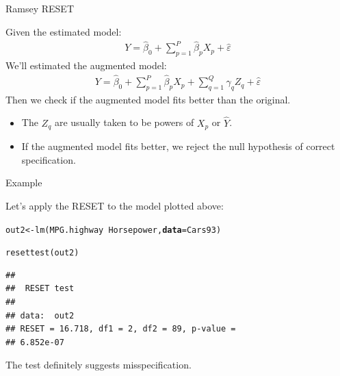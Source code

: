\documentclass{beamer}\usepackage[]{graphicx}\usepackage[]{color}
\makeatletter
\newcommand{\hlopt}[1]{\textcolor[rgb]{0,0,0}{#1}}%
\newcommand{\hlstd}[1]{\textcolor[rgb]{0,0,0}{#1}}%
\newcommand{\hlkwb}[1]{\textcolor[rgb]{0,0.341,0.682}{#1}}%
\newcommand{\hlkwc}[1]{\textcolor[rgb]{0,0,0}{\textbf{#1}}}%
\newcommand{\hlkwd}[1]{\textcolor[rgb]{0.004,0.004,0.506}{#1}}%
\newenvironment{kframe}{%
 \def\at@end@of@kframe{}%
 \ifinner\ifhmode%
  \def\at@end@of@kframe{\end{minipage}}%
  \begin{minipage}{\columnwidth}%
 \fi\fi%
 \def\FrameCommand##1{\hskip\@totalleftmargin \hskip-\fboxsep
 \colorbox{shadecolor}{##1}\hskip-\fboxsep
     \hskip-\linewidth \hskip-\@totalleftmargin \hskip\columnwidth}%
 \MakeFramed {\advance\hsize-\width
   \@totalleftmargin\z@ \linewidth\hsize
   \@setminipage}}%
 {\par\unskip\endMakeFramed%
 \at@end@of@kframe}
\newenvironment{knitrout}{}{} %
\makeatother
\begin{document}

\begin{frame}{Ramsey RESET}
  
  Given the estimated model:
  \begin{align*}
    Y = \hat{\beta}_0 + \sum_{p = 1}^P \hat{\beta}_pX_p + \hat{\varepsilon}
  \end{align*}
  We'll estimated the augmented model:
  \begin{align*}
    Y = \hat{\beta}_0 + \sum_{p = 1}^P \hat{\beta}_pX_p + \sum_{q = 1}^Q \hat{\gamma}_q Z_q + \hat{\varepsilon}
  \end{align*}
  Then we check if the augmented model fits better than the original.
  \begin{itemize}
  \item The $Z_q$ are usually taken to be powers of $X_p$ or $\hat{Y}$.
  \item If the augmented model fits better, we reject the null hypothesis of 
    correct specification.
  \end{itemize}
  
\end{frame}

\watermarkoff %

\begin{frame}[fragile]{Example}

  Let's apply the RESET to the model plotted above:
\begin{knitrout}\footnotesize
{}\color{fgcolor}\begin{kframe}
\begin{alltt}
\hlstd{out2} \hlkwb{<-} \hlkwd{lm}\hlstd{(MPG.highway} \hlopt{~} \hlstd{Horsepower,} \hlkwc{data} \hlstd{= Cars93)}

\hlkwd{resettest}\hlstd{(out2)}
\end{alltt}
\begin{verbatim}
## 
## 	RESET test
## 
## data:  out2
## RESET = 16.718, df1 = 2, df2 = 89, p-value =
## 6.852e-07
\end{verbatim}
\end{kframe}
\end{knitrout}

The test definitely suggests misspecification.

\end{frame}
\end{document}
